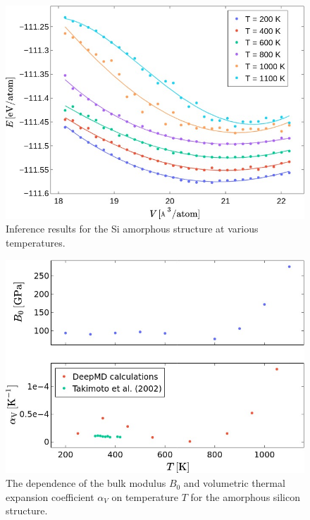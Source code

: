 \begin{figure}
  \begin{center}
    \includegraphics[width=.8\textwidth]{
      asset/amorphous_ev_curves.jpg
    }
  \end{center}
  \caption{Inference results for the Si amorphous structure at various
  temperatures.}
  \label{fig:amorphous_inference}
\end{figure}

\begin{figure}
  \begin{center}
    \includegraphics[width=.8\textwidth]{
      asset/amorphous_properties.jpg
    }
  \end{center}
  \caption{The dependence of the bulk modulus $B_0$ and volumetric thermal
  expansion coefficient $\alpha_V$ on temperature $T$ for the amorphous
  silicon structure.}
  \label{fig:amorphous_properties}
\end{figure}

